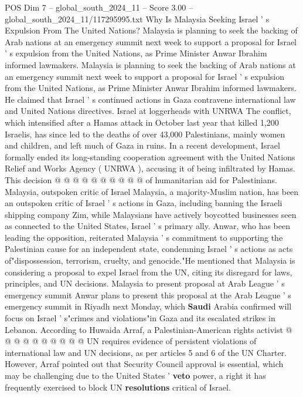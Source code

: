\begin{textsample}{POS Dim 7 – global\_south\_2024\_11 – Score 3.00 – global\_south\_2024\_11/117295995.txt}  \label{ex:f7_pos_012}
Why Is Malaysia Seeking Israel ' s Expulsion From The United Nations?
Malaysia is planning to seek the backing of Arab nations at an emergency summit next week to support a proposal for Israel ' s expulsion from the United Nations, as Prime Minister Anwar Ibrahim informed lawmakers.
Malaysia is planning to seek the backing of Arab nations at an emergency summit next week to support a proposal for Israel ' s expulsion from the United Nations, as Prime Minister Anwar Ibrahim informed lawmakers.
He claimed that Israel ' s continued actions in Gaza contravene international law and United Nations directives.
Israel at loggerheads with UNRWA The conflict, which intensified after a Hamas attack in October last year that killed 1,200 Israelis, has since led to the deaths of over 43,000 Palestinians, mainly women and children, and left much of Gaza in ruins.
In a recent development, Israel formally ended its long-standing cooperation agreement with the United Nations Relief and Works Agency ( UNRWA ), accusing it of being infiltrated by Hamas.
This decision @ @ @ @ @ @ @ @ @ @ of humanitarian aid for Palestinians.
Malaysia, outspoken critic of Israel Malaysia, a majority-Muslim nation, has been an outspoken critic of Israel ' s actions in Gaza, including banning the Israeli shipping company Zim, while Malaysians have actively boycotted businesses seen as connected to the United States, Israel ' s primary ally.
Anwar, who has been leading the opposition, reiterated Malaysia ' s commitment to supporting the Palestinian cause for an independent state, condemning Israel ' s actions as acts of"dispossession, terrorism, cruelty, and genocide."He mentioned that Malaysia is considering a proposal to expel Israel from the UN, citing its disregard for laws, principles, and UN decisions.
Malaysia to present proposal at Arab League ' s emergency summit Anwar plans to present this proposal at the Arab League ' s emergency summit in Riyadh next Monday, which \textbf{Saudi} Arabia confirmed will focus on Israel ' s"crimes and violations"in Gaza and its escalated strikes in Lebanon.
According to Huwaida Arraf, a Palestinian-American rights activist @ @ @ @ @ @ @ @ @ @ UN requires evidence of persistent violations of international law and UN decisions, as per articles 5 and 6 of the UN Charter.
However, Arraf pointed out that Security Council approval is essential, which may be challenging due to the United States ' \textbf{veto} power, a right it has frequently exercised to block UN \textbf{resolutions} critical of Israel.

\end{textsample}
